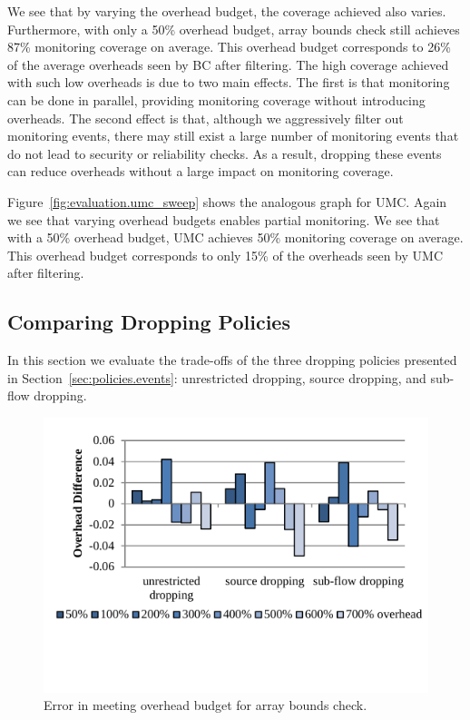 We see that by varying the overhead budget, the coverage achieved also varies.
Furthermore, with only a 50\% overhead budget, array bounds check still
achieves 87\% monitoring coverage on average. This overhead budget corresponds
to 26\% of the average overheads seen by BC after filtering. The high coverage
achieved with such low overheads is due to two main effects.  The first is that
monitoring can be done in parallel, providing monitoring coverage without
introducing overheads. The second effect is that, although we aggressively
filter out monitoring events, there may still exist a large number of
monitoring events that do not lead to security or reliability checks. As a
result, dropping these events can reduce overheads without a large impact on
monitoring coverage.

Figure~\ref{fig:evaluation.umc_sweep} shows the analogous graph for UMC. Again
we see that varying overhead budgets enables partial monitoring. We see that
with a 50\% overhead budget, UMC achieves 50\% monitoring coverage on average.
This overhead budget corresponds to only 15\% of the overheads seen by UMC
after filtering.

\subsection{Comparing Dropping Policies}

In this section we evaluate the trade-offs of the three dropping policies
presented in Section~\ref{sec:policies.events}: unrestricted dropping, source
dropping, and sub-flow dropping.

\begin{figure}
  \begin{center}
    \includegraphics[width=\columnwidth]{figs/data_bc_exec_time.pdf}
    \vspace{-0.2in}
    \caption{Error in meeting overhead budget for array bounds check.}
    \label{fig:evaluation.bc_exec_time}
    \vspace{-0.2in}
  \end{center}
\end{figure}

